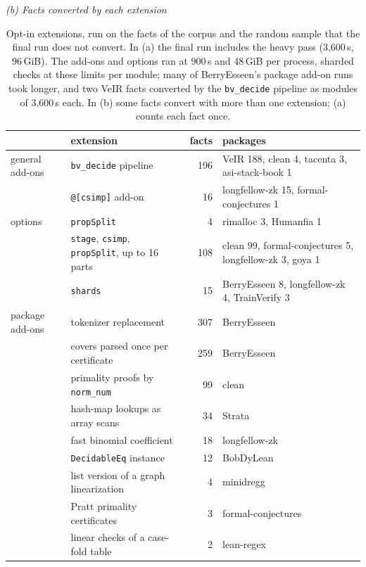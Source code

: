 \documentclass[11pt]{article}
\begin{document}
\begin{table}[tp]
\bigskip
{\itshape (b) Facts converted by each extension}\par\smallskip
\setlength{\tabcolsep}{6pt}
\begin{tabular}{llr>{\raggedright\arraybackslash}p{5.2cm}}\toprule
 & extension & facts & packages\\\midrule
general add-ons & \texttt{bv\_decide} pipeline & 196 & VeIR 188, clean 4, tacenta 3, asi-stack-book 1\\
 & \verb|@[csimp]| add-on & 16 & longfellow-zk 15, formal-conjectures 1\\\midrule
options & \texttt{propSplit} & 4 & rimalloc 3, Humanfia 1\\
 & \texttt{stage}, \texttt{csimp}, \texttt{propSplit}, up to 16 parts & 108 & clean 99, formal-conjectures 5,
 longfellow-zk 3, goya 1\\
 & \texttt{shards} & 15 & BerryEsseen 8, longfellow-zk 4, TrainVerify 3\\\midrule
package add-ons & tokenizer replacement & 307 & BerryEsseen\\
 & covers parsed once per certificate & 259 & BerryEsseen\\
 & primality proofs by \texttt{norm\_num} & 99 & clean\\
 & hash-map lookups as array scans & 34 & Strata\\
 & fast binomial coefficient & 18 & longfellow-zk\\
 & \texttt{DecidableEq} instance & 12 & BobDyLean\\
 & list version of a graph linearization & 4 & minidregg\\
 & Pratt primality certificates & 3 & formal-conjectures\\
 & linear checks of a case-fold table & 2 & lean-regex\\\bottomrule
\end{tabular}
\caption{Opt-in extensions, run on the facts of the corpus and the random sample that the final run does not
convert. In (a) the final run includes the heavy pass (3,600\,s, 96\,GiB). The add-ons and options ran at 900\,s
and 48\,GiB per process, sharded checks at these limits per module; many of BerryEsseen's package add-on runs
took longer, and two VeIR facts converted by the \texttt{bv\_decide} pipeline as modules of 3,600\,s each. In
(b) some facts convert with more than one extension; (a) counts each fact once.}\label{tab:ext}
\end{table}
\end{document}
